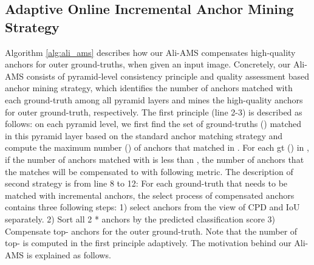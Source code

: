 \documentclass[10pt,twocolumn,letterpaper]{article}
\begin{document}
\subsection{Adaptive Online Incremental Anchor Mining Strategy}
\label{sec:Ali-AMS}
Algorithm \ref{alg:ali_ams} describes how our Ali-AMS compensates high-quality anchors for outer ground-truths, when given an input image. Concretely, our Ali-AMS consists of pyramid-level consistency principle and quality assessment based anchor mining strategy, which identifies the number of anchors matched with each ground-truth among all pyramid layers and mines the high-quality anchors for outer ground-truth, respectively. The first principle (line 2-3) is described as follows: on each pyramid level, we first find the set of ground-truths () matched in this pyramid layer based on the standard anchor matching strategy \cite{lin2017focal} and compute the maximum number () of anchors that matched in . For each gt () in , if the number of anchors matched with  is less than , the number of anchors that the  matches will be  compensated to  with following metric.  The description of  second strategy is from line 8 to 12: For each ground-truth that needs to be matched with incremental anchors, the select process of compensated anchors contains three following steps: 1) select  anchors from the view of CPD and IoU separately. 2) Sort all 2 *  anchors by the predicted classification score 3) Compensate top- anchors for the outer ground-truth. Note that the number of top- is computed in the first principle adaptively. The motivation behind our Ali-AMS is explained as follows.
\end{document}
